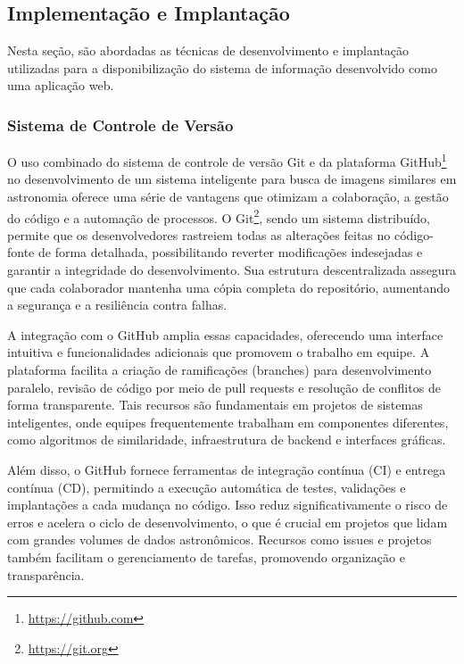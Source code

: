 \subsection{Implementação e Implantação}
\label{sec:si-implantacao}

Nesta seção, são abordadas as técnicas de desenvolvimento e implantação utilizadas para a disponibilização do sistema de informação desenvolvido como uma aplicação web.


\subsubsection{Sistema de Controle de Versão}
\label{sec:si-devops}

O uso combinado do sistema de controle de versão Git e da plataforma GitHub\footnote{\url{https://github.com}} no desenvolvimento de um sistema inteligente para busca de imagens similares em astronomia oferece uma série de vantagens que otimizam a colaboração, a gestão do código e a automação de processos. O Git\footnote{\url{https://git.org}}, sendo um sistema distribuído, permite que os desenvolvedores rastreiem todas as alterações feitas no código-fonte de forma detalhada, possibilitando reverter modificações indesejadas e garantir a integridade do desenvolvimento. Sua estrutura descentralizada assegura que cada colaborador mantenha uma cópia completa do repositório, aumentando a segurança e a resiliência contra falhas.

A integração com o GitHub amplia essas capacidades, oferecendo uma interface intuitiva e funcionalidades adicionais que promovem o trabalho em equipe. A plataforma facilita a criação de ramificações (branches) para desenvolvimento paralelo, revisão de código por meio de pull requests e resolução de conflitos de forma transparente. Tais recursos são fundamentais em projetos de sistemas inteligentes, onde equipes frequentemente trabalham em componentes diferentes, como algoritmos de similaridade, infraestrutura de backend e interfaces gráficas.

Além disso, o GitHub fornece ferramentas de integração contínua (CI) e entrega contínua (CD), permitindo a execução automática de testes, validações e implantações a cada mudança no código. Isso reduz significativamente o risco de erros e acelera o ciclo de desenvolvimento, o que é crucial em projetos que lidam com grandes volumes de dados astronômicos. Recursos como issues e projetos também facilitam o gerenciamento de tarefas, promovendo organização e transparência.

